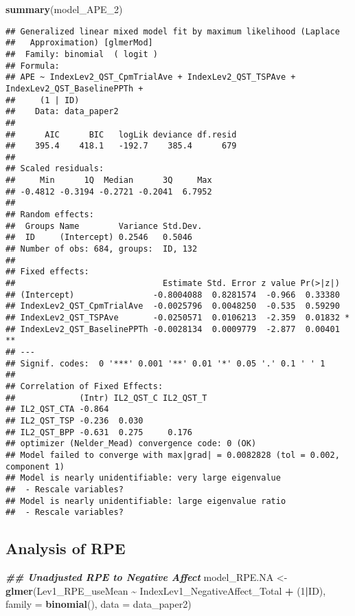 \documentclass[
  12pt,
]{article}
\newenvironment{Shaded}{\begin{snugshade}}{\end{snugshade}}
\newcommand{\AttributeTok}[1]{\textcolor[rgb]{0.13,0.29,0.53}{#1}}
\newcommand{\DecValTok}[1]{\textcolor[rgb]{0.00,0.00,0.81}{#1}}
\newcommand{\DocumentationTok}[1]{\textcolor[rgb]{0.56,0.35,0.01}{\textbf{\textit{#1}}}}
\newcommand{\FunctionTok}[1]{\textcolor[rgb]{0.13,0.29,0.53}{\textbf{#1}}}
\newcommand{\NormalTok}[1]{#1}
\newcommand{\OtherTok}[1]{\textcolor[rgb]{0.56,0.35,0.01}{#1}}
\newcommand{\SpecialCharTok}[1]{\textcolor[rgb]{0.81,0.36,0.00}{\textbf{#1}}}
\begin{document}
\begin{Shaded}
\begin{Highlighting}[]
\FunctionTok{summary}\NormalTok{(model\_APE\_2)}
\end{Highlighting}
\end{Shaded}

\begin{verbatim}
## Generalized linear mixed model fit by maximum likelihood (Laplace
##   Approximation) [glmerMod]
##  Family: binomial  ( logit )
## Formula: 
## APE ~ IndexLev2_QST_CpmTrialAve + IndexLev2_QST_TSPAve + IndexLev2_QST_BaselinePPTh +  
##     (1 | ID)
##    Data: data_paper2
## 
##      AIC      BIC   logLik deviance df.resid 
##    395.4    418.1   -192.7    385.4      679 
## 
## Scaled residuals: 
##     Min      1Q  Median      3Q     Max 
## -0.4812 -0.3194 -0.2721 -0.2041  6.7952 
## 
## Random effects:
##  Groups Name        Variance Std.Dev.
##  ID     (Intercept) 0.2546   0.5046  
## Number of obs: 684, groups:  ID, 132
## 
## Fixed effects:
##                              Estimate Std. Error z value Pr(>|z|)   
## (Intercept)                -0.8004088  0.8281574  -0.966  0.33380   
## IndexLev2_QST_CpmTrialAve  -0.0025796  0.0048250  -0.535  0.59290   
## IndexLev2_QST_TSPAve       -0.0250571  0.0106213  -2.359  0.01832 * 
## IndexLev2_QST_BaselinePPTh -0.0028134  0.0009779  -2.877  0.00401 **
## ---
## Signif. codes:  0 '***' 0.001 '**' 0.01 '*' 0.05 '.' 0.1 ' ' 1
## 
## Correlation of Fixed Effects:
##             (Intr) IL2_QST_C IL2_QST_T
## IL2_QST_CTA -0.864                    
## IL2_QST_TSP -0.236  0.030             
## IL2_QST_BPP -0.631  0.275     0.176   
## optimizer (Nelder_Mead) convergence code: 0 (OK)
## Model failed to converge with max|grad| = 0.0082828 (tol = 0.002, component 1)
## Model is nearly unidentifiable: very large eigenvalue
##  - Rescale variables?
## Model is nearly unidentifiable: large eigenvalue ratio
##  - Rescale variables?
\end{verbatim}

\hypertarget{analysis-of-rpe}{%
\subsection{Analysis of RPE}\label{analysis-of-rpe}}

\begin{Shaded}
\begin{Highlighting}[]
\DocumentationTok{\#\# Unadjusted RPE to Negative Affect}
\NormalTok{model\_RPE.NA }\OtherTok{\textless{}{-}} \FunctionTok{glmer}\NormalTok{(Lev1\_RPE\_useMean }\SpecialCharTok{\textasciitilde{}}\NormalTok{ IndexLev1\_NegativeAffect\_Total }\SpecialCharTok{+}\NormalTok{ (}\DecValTok{1}\SpecialCharTok{|}\NormalTok{ID), }\AttributeTok{family =} \FunctionTok{binomial}\NormalTok{(), }\AttributeTok{data =}\NormalTok{ data\_paper2)}
\end{Highlighting}
\end{Shaded}
\end{document}
